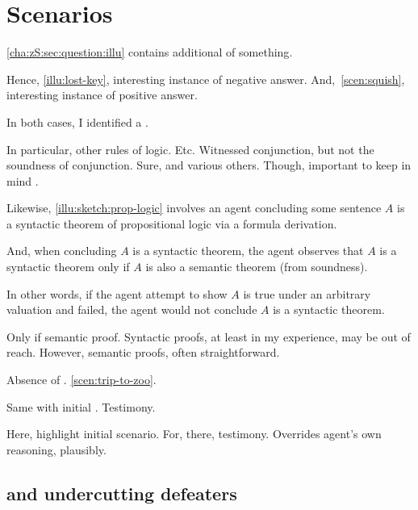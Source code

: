\section{Scenarios}
\label{cha:zS:sec:question:scenarios}

\begin{note}
  \autoref{cha:zS:sec:question:illu} contains additional  of {\color{red} something}.
\end{note}

\begin{note}
  Hence, \autoref{illu:lost-key}, interesting instance of negative answer.
  And,~\autoref{scen:squish}, interesting instance of positive answer.

  In both cases, I identified a \curb{}.

  In particular, other rules of logic.
  Etc.
  Witnessed conjunction, but not the soundness of conjunction.
  Sure, and various others.
  Though, important to keep in mind \curb{}.
\end{note}

\begin{note}
  Likewise, \autoref{illu:sketch:prop-logic} involves an agent concluding some sentence \(A\) is a syntactic theorem of propositional logic via a formula derivation.

  And, when concluding \(A\) is a syntactic theorem, the agent observes that \(A\) is a syntactic theorem only if \(A\) is also a semantic theorem (from soundness).

  In other words, if the agent attempt to show \(A\) is true under an arbitrary valuation and failed, the agent would not conclude \(A\) is a syntactic theorem.

  Only if semantic proof.
  Syntactic proofs, at least in my experience, may be out of reach.
  However, semantic proofs, often straightforward.
\end{note}

\begin{note}
  Absence of \requ{}.
  \autoref{scen:trip-to-zoo}.

  Same with initial .
  Testimony.
\end{note}

\begin{note}
  Here, highlight initial scenario.
  For, there, testimony.
  Overrides agent's own reasoning, plausibly.
\end{note}

\subsection{ and undercutting defeaters}

